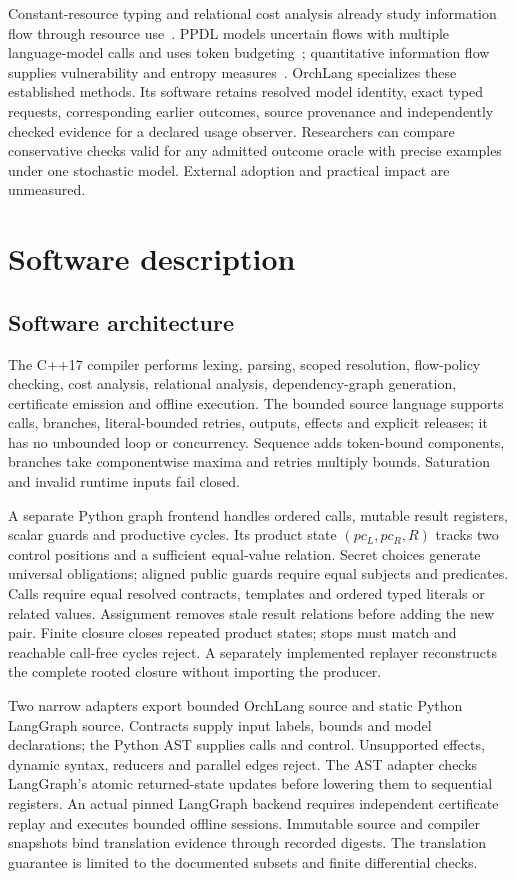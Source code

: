 \documentclass[preprint,12pt, a4paper]{elsarticle}
\begin{document}
Constant-resource typing and relational cost analysis already study information flow through resource use~\cite{ranif,relcost}. PPDL models uncertain flows with multiple language-model calls and uses token budgeting~\cite{ppdl}; quantitative information flow supplies vulnerability and entropy measures~\cite{smith,symbolic}. OrchLang specializes these established methods. Its software retains resolved model identity, exact typed requests, corresponding earlier outcomes, source provenance and independently checked evidence for a declared usage observer. Researchers can compare conservative checks valid for any admitted outcome oracle with precise examples under one stochastic model. External adoption and practical impact are unmeasured.

\section{Software description}
\subsection{Software architecture}
The C++17 compiler performs lexing, parsing, scoped resolution, flow-policy checking, cost analysis, relational analysis, dependency-graph generation, certificate emission and offline execution. The bounded source language supports calls, branches, literal-bounded retries, outputs, effects and explicit releases; it has no unbounded loop or concurrency. Sequence adds token-bound components, branches take componentwise maxima and retries multiply bounds. Saturation and invalid runtime inputs fail closed.

A separate Python graph frontend handles ordered calls, mutable result registers, scalar guards and productive cycles. Its product state $(pc_L,pc_R,R)$ tracks two control positions and a sufficient equal-value relation. Secret choices generate universal obligations; aligned public guards require equal subjects and predicates. Calls require equal resolved contracts, templates and ordered typed literals or related values. Assignment removes stale result relations before adding the new pair. Finite closure closes repeated product states; stops must match and reachable call-free cycles reject. A separately implemented replayer reconstructs the complete rooted closure without importing the producer.

Two narrow adapters export bounded OrchLang source and static Python LangGraph source. Contracts supply input labels, bounds and model declarations; the Python AST supplies calls and control. Unsupported effects, dynamic syntax, reducers and parallel edges reject. The AST adapter checks LangGraph's atomic returned-state updates before lowering them to sequential registers. An actual pinned LangGraph backend requires independent certificate replay and executes bounded offline sessions. Immutable source and compiler snapshots bind translation evidence through recorded digests. The translation guarantee is limited to the documented subsets and finite differential checks.
\end{document}
